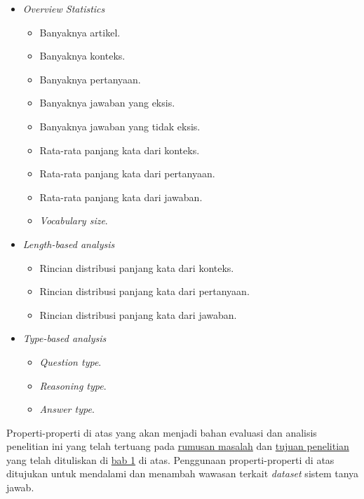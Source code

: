 \begin{itemize}

    \item \emph{Overview Statistics}

        \begin{itemize}
            \item Banyaknya artikel.
            \item Banyaknya konteks.
            \item Banyaknya pertanyaan.
            \item Banyaknya jawaban yang eksis.
            \item Banyaknya jawaban yang tidak eksis.
            \item Rata-rata panjang kata dari konteks.
            \item Rata-rata panjang kata dari pertanyaan.
            \item Rata-rata panjang kata dari jawaban.
            \item \emph{Vocabulary size}.
        \end{itemize}

    \item \emph{Length-based analysis}

        \begin{itemize}
            \item Rincian distribusi panjang kata dari konteks.
            \item Rincian distribusi panjang kata dari pertanyaan.
            \item Rincian distribusi panjang kata dari jawaban.
        \end{itemize}
        
    \item \emph{Type-based analysis}

        \begin{itemize}
            \item \emph{Question type}.
            \item \emph{Reasoning type}.
            \item \emph{Answer type}.
        \end{itemize}

\end{itemize}

Properti-properti di atas yang akan menjadi bahan evaluasi dan analisis penelitian ini yang telah tertuang pada \hyperref[sec:rumusanMasalah]{rumusan masalah} dan \hyperref[sec:tujuanPenelitian]{tujuan penelitian} yang telah dituliskan di \hyperref[bab:1]{bab 1} di atas. Penggunaan properti-properti di atas ditujukan untuk mendalami dan menambah wawasan terkait \emph{dataset} sistem tanya jawab.


